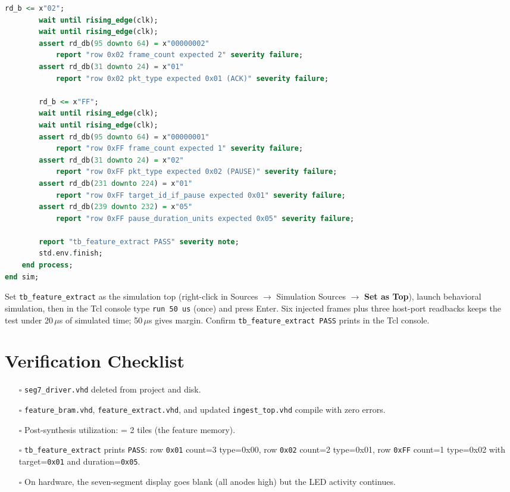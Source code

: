 \documentclass[11pt,letterpaper]{article}
\begin{document}
\begin{lstlisting}[language=VHDL, caption={\texttt{tb\_feature\_extract.vhd} --- six-frame stimulus, three-row readback. Verifies frame counts, \texttt{pkt\_type} field, and PAUSE-only fields.}]
        rd_b <= x"02";
        wait until rising_edge(clk);
        wait until rising_edge(clk);
        assert rd_db(95 downto 64) = x"00000002"
            report "row 0x02 frame_count expected 2" severity failure;
        assert rd_db(31 downto 24) = x"01"
            report "row 0x02 pkt_type expected 0x01 (ACK)" severity failure;

        rd_b <= x"FF";
        wait until rising_edge(clk);
        wait until rising_edge(clk);
        assert rd_db(95 downto 64) = x"00000001"
            report "row 0xFF frame_count expected 1" severity failure;
        assert rd_db(31 downto 24) = x"02"
            report "row 0xFF pkt_type expected 0x02 (PAUSE)" severity failure;
        assert rd_db(231 downto 224) = x"01"
            report "row 0xFF target_id_if_pause expected 0x01" severity failure;
        assert rd_db(239 downto 232) = x"05"
            report "row 0xFF pause_duration_units expected 0x05" severity failure;

        report "tb_feature_extract PASS" severity note;
        std.env.finish;
    end process;
end sim;
\end{lstlisting}

Set \texttt{tb\_feature\_extract} as the simulation top (right-click in Sources $\to$ Simulation Sources $\to$ \textbf{Set as Top}), launch behavioral simulation, then in the Tcl console type \texttt{run 50 us} (once) and press Enter. Six injected frames plus three host-port readbacks keeps the test under 20\,$\mu$s of simulated time; 50\,$\mu$s gives margin. Confirm \texttt{tb\_feature\_extract PASS} prints in the Tcl console.

\section{Verification Checklist}
\begin{itemize}[leftmargin=2em]
	\item[$\square$] \texttt{seg7\_driver.vhd} deleted from project and disk.
	\item[$\square$] \texttt{feature\_bram.vhd}, \texttt{feature\_extract.vhd}, and updated \texttt{ingest\_top.vhd} compile with zero errors.
	\item[$\square$] Post-synthesis utilization: \BRAM{} = 2 tiles (the feature memory).
	\item[$\square$] \texttt{tb\_feature\_extract} prints \texttt{PASS}: row \texttt{0x01} count=3 type=0x00, row \texttt{0x02} count=2 type=0x01, row \texttt{0xFF} count=1 type=0x02 with target=\texttt{0x01} and duration=\texttt{0x05}.
	\item[$\square$] On hardware, the seven-segment display goes blank (all anodes high) but the LED activity continues.
\end{itemize}
\end{document}
